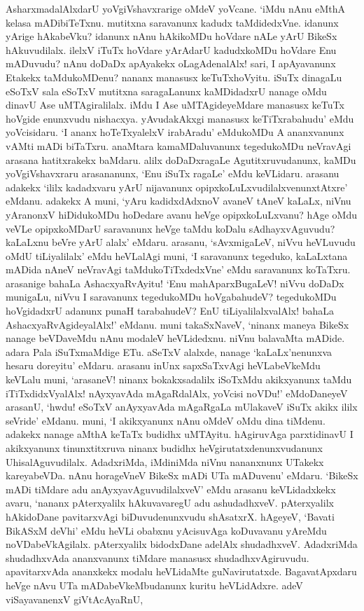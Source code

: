 AsharxmadalAlxdarU yoVgiVshavxrarige oMdeV yoVcane. `iMdu nAnu eMthA kelasa mADibiTeTxnu. mutitxna saravanunx kadudx taMdidedxVne. idanunx yArige hAkabeVku? idanunx nAnu hAkikoMDu hoVdare nALe yArU BikeSx hAkuvudilalx. ilelxV iTuTx hoVdare yArAdarU kadudxkoMDu hoVdare Enu mADuvudu? nAnu doDaDx apAyakekx oLagAdenalAlx! sari, I apAyavanunx Etakekx taMdukoMDenu? nananx manasusx keTuTxhoVyitu. iSuTx dinagaLu eSoTxV sala eSoTxV mutitxna saragaLanunx kaMDidadxrU nanage oMdu dinavU Ase uMTAgiralilalx. iMdu I Ase uMTAgideyeMdare manasusx keTuTx hoVgide enunxvudu nishacxya. yAvudakAkxgi manasusx keTiTxrabahudu' eMdu yoVcisidaru. `I ananx hoTeTxyalelxV irabAradu' eMdukoMDu A ananxvanunx vAMti mADi biTaTxru. anaMtara kamaMDaluvanunx tegedukoMDu neVravAgi arasana hatitxrakekx baMdaru. alilx doDaDxragaLe Agutitxruvudanunx, kaMDu yoVgiVshavxraru arasananunx, `Enu iSuTx ragaLe' eMdu keVLidaru. arasanu adakekx `ililx kadadxvaru yArU nijavanunx opipxkoLuLxvudilalxvenunxtAtxre' eMdanu. adakekx A muni, `yAru kadidxdAdxnoV avaneV tAneV kaLaLx, niVnu yAranonxV hiDidukoMDu hoDedare avanu heVge opipxkoLuLxvanu? hAge oMdu veVLe opipxkoMDarU saravanunx heVge taMdu koDalu sAdhayxvAguvudu? kaLaLxnu beVre yArU alalx' eMdaru. arasanu, `sAvxmigaLeV, niVvu heVLuvudu oMdU tiLiyalilalx' eMdu heVLalAgi muni, `I saravanunx tegeduko, kaLaLxtana mADida nAneV neVravAgi taMdukoTiTxdedxVne' eMdu saravanunx koTaTxru. arasanige bahaLa AshacxyaRvAyitu! `Enu mahAparxBugaLeV! niVvu doDaDx munigaLu, niVvu I saravanunx tegedukoMDu hoVgabahudeV? tegedukoMDu hoVgidadxrU adanunx punaH tarabahudeV? EnU tiLiyalilalxvalAlx! bahaLa AshacxyaRvAgideyalAlx!' eMdanu. muni takaSxNaveV, `ninanx maneya BikeSx nanage beVDaveMdu nAnu modaleV heVLidedxnu. niVnu balavaMta mADide. adara Pala iSuTxmaMdige ETu. aSeTxV alalxde, nanage `kaLaLx'nenunxva hesaru doreyitu' eMdaru. arasanu inUnx sapxSaTxvAgi heVLabeVkeMdu keVLalu muni, `arasaneV! ninanx bokakxsadalilx iSoTxMdu akikxyanunx taMdu iTiTxdidxVyalAlx! nAyxyavAda mAgaRdalAlx, yoVcisi noVDu!' eMdoDaneyeV arasanU, `hwdu! eSoTxV anAyxyavAda mAgaRgaLa mUlakaveV iSuTx akikx ililx seVride' eMdanu. muni, `I akikxyanunx nAnu oMdeV oMdu dina tiMdenu. adakekx nanage aMthA keTaTx budidhx uMTAyitu. hAgiruvAga parxtidinavU I akikxyanunx tinunxtitxruva ninanx budidhx heVgirutatxdenunxvudanunx UhisalAguvudilalx. AdadxriMda, iMdiniMda niVnu nananxnunx UTakekx kareyabeVDa. nAnu horageVneV BikeSx mADi UTa mADuvenu' eMdaru. `BikeSx mADi tiMdare adu anAyxyavAguvudilalxveV' eMdu arasanu keVLidadxkekx avaru, `nananx pAterxyalilx hAkuvavaregU adu ashudadhxveV. pAterxyalilx hAkidoDane pavitarxvAgi biDuvudenunxvudu shAsatxrX. hAgeyeV, `Bavati BikASxM deVhi' eMdu heVLi obabxnu yAcisuvAga koDuvavanu yAreMdu noVDabeVkAgilalx. pAterxyalilx bidodxDane adelAlx shudadhxveV. AdadxriMda shudadhxvAda ananxvanunx tiMdare manasusx shudadhxvAgiruvudu. apavitarxvAda ananxkekx modalu heVLidaMte guNavirutatxde. BagavatApxdaru heVge nAvu UTa mADabeVkeMbudanunx kuritu heVLidAdxre. adeV viSayavanenxV giVtAcAyaRnU,

